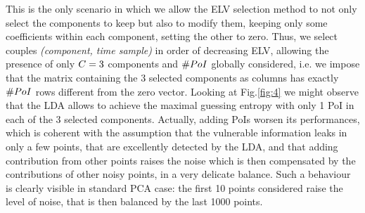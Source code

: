 This is the only scenario in which we allow the ELV selection method to not only select the components to keep but also to modify them, keeping only some coefficients within each component, setting the other to zero. Thus, we select couples \textit{(component, time sample)} in order of decreasing ELV, allowing the presence of only $C = 3$ components and $\# PoI$ globally considered, {i.e.} we impose that the matrix containing the 3 selected components as columns has exactly $\# PoI$ rows different from the zero vector. 
Looking at Fig.\ref{fig:4} we might observe that the LDA allows to achieve the maximal guessing entropy with only 1 PoI in each of the 3 selected components. 
Actually, adding PoIs worsen its performances, which is coherent with the assumption that the vulnerable information leaks in only a few points, that are excellently detected by the LDA, and that adding contribution from other points raises the noise which is then compensated by the contributions of other noisy points, in a very delicate balance. Such a behaviour is clearly visible in standard PCA case: the first 10 points considered raise the level of noise, that is then balanced by the last 1000 points.



